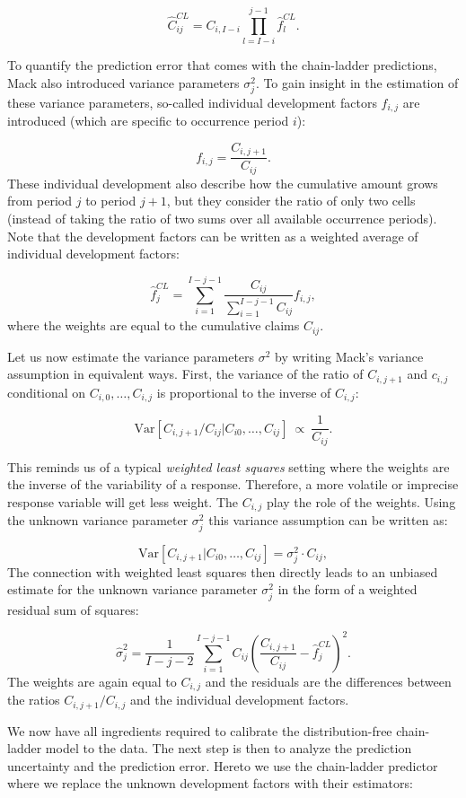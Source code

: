 \documentclass[]{book}
\begin{document}
\[
\hat{C}^{CL}_{ij} = C_{i,I-i}\prod_{l=I-i}^{j-1} \hat{f}_l^{CL}.
\]

To quantify the prediction error that comes with the chain-ladder
predictions, Mack also introduced variance parameters \(\sigma^2_j\). To
gain insight in the estimation of these variance parameters, so-called
individual development factors \(f_{i,j}\) are introduced (which are
specific to occurrence period \(i\)):

\[
f_{i,j} = \frac{C_{i,j+1}}{C_{ij}}.
\] These individual development also describe how the cumulative amount
grows from period \(j\) to period \(j+1\), but they consider the ratio
of only two cells (instead of taking the ratio of two sums over all
available occurrence periods). Note that the development factors can be
written as a weighted average of individual development factors:

\[
\hat{f}_j^{CL} = \sum_{i=1}^{I-j-1} \frac{C_{ij}}{\sum_{i=1}^{I-j-1} C_{ij}} f_{i,j},
\] where the weights are equal to the cumulative claims \(C_{ij}\).

Let us now estimate the variance parameters \(\sigma^2\) by writing
Mack's variance assumption in equivalent ways. First, the variance of
the ratio of \(C_{i,j+1}\) and \(c_{i,j}\) conditional on
\(C_{i,0},\ldots, C_{i,j}\) is proportional to the inverse of
\(C_{i,j}\):

\[
\text{Var}[C_{i,j+1}/C_{ij}|C_{i0},\ldots,C_{ij}] ~ \propto ~ \frac{1}{C_{ij}}.
\]

This reminds us of a typical \emph{weighted least squares} setting where
the weights are the inverse of the variability of a response. Therefore,
a more volatile or imprecise response variable will get less weight. The
\(C_{i,j}\) play the role of the weights. Using the unknown variance
parameter \(\sigma^2_j\) this variance assumption can be written as:

\[
\text{Var}[C_{i,j+1}|C_{i0},\ldots,C_{ij}] = \sigma^2_j \cdot C_{ij},
\] The connection with weighted least squares then directly leads to an
unbiased estimate for the unknown variance parameter \(\sigma^2_j\) in
the form of a weighted residual sum of squares:

\[
\hat{\sigma}^2_j = \frac{1}{I-j-2}\sum_{i=1}^{I-j-1} C_{ij}\left(\frac{C_{i,j+1}}{C_{ij}}-\hat{f}_j^{CL}\right)^2.
\] The weights are again equal to \(C_{i,j}\) and the residuals are the
differences between the ratios \(C_{i,j+1}/C_{i,j}\) and the individual
development factors.

We now have all ingredients required to calibrate the distribution-free
chain-ladder model to the data. The next step is then to analyze the
prediction uncertainty and the prediction error. Hereto we use the
chain-ladder predictor where we replace the unknown development factors
with their estimators:
\end{document}
